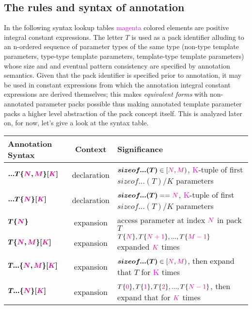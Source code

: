 
\subsection{The rules and syntax of annotation}

\p In the following syntax lookup tables \textcolor{Magenta}{magenta} colored elements are positive integral constant expressions.
The letter $T$ is used as a pack identifier alluding to an n-ordered sequence of parameter types of the same type (non-type template parameters, type-type template parameters, template-type template parameters) whose size and and eventual pattern consistency are specified by annotation semantics.
Given that the pack identifier is specified prior to annotation, it may be used in constant expressions from which the annotation integral constant expressions are derived themselves; this makes \textit{equivalent forms} with non-annotated parameter packs possible thus making annotated template parameter packs a higher level abstraction of the pack concept itself.
This is analyzed later on, for now, let's give a look at the syntax table.

\begin{tabularx}{\textwidth}{l|c|X}
  \textbf{Annotation Syntax} & \textbf{Context}  &\textbf{Significance} \\
\hline
$\bm{...T\{\textcolor{Magenta}{\textcolor{Magenta}{N}},\textcolor{Magenta}{M}\}[\textcolor{Magenta}{K}]}$ & declaration & $\bm{sizeof...(T)} \in [\textcolor{Magenta}{N},\textcolor{Magenta}{M})$, \textcolor{Magenta}{K}-tuple of first $sizeof...(T)/K$ parameters \\
$\bm{...T\{\textcolor{Magenta}{N}\}[\textcolor{Magenta}{K}]}$ & declaration & $\bm{sizeof...(T)} == \textcolor{Magenta}{N}$, \textcolor{Magenta}{K}-tuple of first $sizeof...(T)/K$ parameters \\
$\bm{T\{\textcolor{Magenta}{N}\}}$ & expansion & access parameter at index $\textcolor{Magenta}{N}$ in pack $T$ \\
$\bm{T\{\textcolor{Magenta}{N},\textcolor{Magenta}{M}\}[\textcolor{Magenta}{K}]}$ & expansion & $T\{\textcolor{Magenta}{N}\},T\{\textcolor{Magenta}{N+1}\},...,T\{\textcolor{Magenta}{M-1}\}$ expanded $\textcolor{Magenta}{K}$ times \\
$\bm{T...\{\textcolor{Magenta}{N},\textcolor{Magenta}{M}\}[\textcolor{Magenta}{K}]}$ & expansion & $\bm{sizeof...(T)} \in [\textcolor{Magenta}{N},\textcolor{Magenta}{M})$, then expand that $T$ for \textcolor{Magenta}{K} times   \\
$\bm{T...\{\textcolor{Magenta}{N}\}[\textcolor{Magenta}{K}]}$ & expansion & $T\{\textcolor{Magenta}{0}\},T\{\textcolor{Magenta}{1}\},T\{\textcolor{Magenta}{2}\},...,T\{\textcolor{Magenta}{N-1}\}$, then expand that for $\textcolor{Magenta}{K}$ times\\
\end{tabularx}

